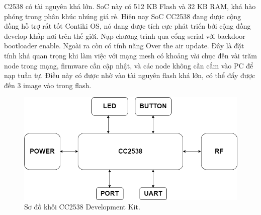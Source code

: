 \documentclass{report}
\begin{document}
C2538 có tài nguyên khá lớn. SoC này có 512 KB Flash và 32 KB RAM, khá hào phóng
trong phân khúc nhúng giá rẻ. Hiện nay SoC CC2538 đang dược cộng đồng hỗ trợ rất tốt Contiki OS,
nó dang được tích cực phát triển bởi cộng đồng develop khắp nơi trên thế giới. Nạp chương
trình qua cổng serial với backdoor bootloader enable. Ngoài ra còn có tính năng Over the air
update. Đây là đặt tính khá quan trọng khi làm việc với mạng mesh có khoảng vài chục đến
vài trăm node trong mạng, firmware cần cập nhật, và các node không cần cắm vào PC để nạp
tuần tự. Điều này có được nhờ vào tài nguyên flash khá lớn, có thể đẩy được đến 3 image vào
trong flash. 
\begin{figure}[h]
	\centering
	\includegraphics[scale = 0.4]{fig35.png}
	\caption{Sơ đồ khối CC2538 Development Kit.}
	\label{fig:Graph35}
\end{figure}
\end{document}
